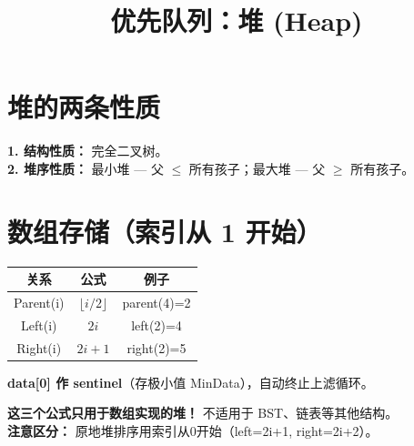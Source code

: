 \documentclass[10pt,a4paper]{article}
\title{\textbf{优先队列：堆 (Heap)}}
\author{}\date{}
\begin{document}
\maketitle\vspace{-8pt}

\section*{堆的两条性质}

\textbf{1. 结构性质：} 完全二叉树。\\
\textbf{2. 堆序性质：} 最小堆 — 父 $\le$ 所有孩子；最大堆 — 父 $\ge$ 所有孩子。

\section*{数组存储（索引从 1 开始）}

\begin{center}
\begin{tabular}{|c|c|c|}
\hline
\textbf{关系} & \textbf{公式} & \textbf{例子} \\
\hline
Parent(i) & $\lfloor i/2 \rfloor$ & parent(4)=2 \\
Left(i) & $2i$ & left(2)=4 \\
Right(i) & $2i+1$ & right(2)=5 \\
\hline
\end{tabular}
\end{center}

\textbf{data[0] 作 sentinel}（存极小值 MinData），自动终止上滤循环。

\begin{keybox}
\textbf{这三个公式只用于数组实现的堆！} 不适用于 BST、链表等其他结构。\\
\textbf{注意区分：} 原地堆排序用索引从0开始（left=2i+1, right=2i+2）。
\end{keybox}
\end{document}
